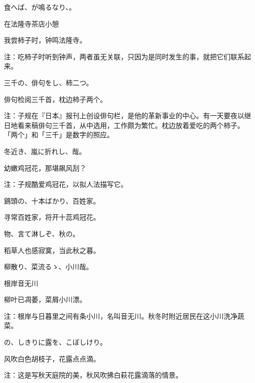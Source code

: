 \begin{haiku}
    {\FH {}食へば、が鳴るなり、。}

    {\FK 在法隆寺茶店小憩}

    {\FK 我尝柿子时，钟鸣法隆寺。}

    {\FT 注：吃柿子时听到钟声，两者虽无关联，只因为是同时发生的事，就把它们联系起来。}
\end{haiku}

\begin{haiku}
    {\FH 三千の、俳句をし、柿二つ。}

    {\FK 俳句检阅三千首，枕边柿子两个。}

    {\FT 注：子规在『日本』报刊上创设俳句栏，是他的革新事业的中心。有一天要夜以继日地看来稿俳句三千首，从中选用，工作颇为繁忙。枕边放着爱吃的两个柿子。「两个」和「三千」是数字的照应。}
\end{haiku}

\begin{haiku}
    {\FH 冬近き、嵐に折れし、哉。}

    {\FK 幼嫩鸡冠花，那堪飙风刮？}

    {\FT 注：子规酷爱鸡冠花，以拟人法描写它。}
\end{haiku}

\begin{haiku}
    {\FH 鷄頭の、十本ばかり、百姓家。}

    {\FK 寻常百姓家，将开十蕊鸡冠花。}
\end{haiku}

\begin{haiku}
    {\FH {}物、言て淋しぞ、秋の。}

    {\FK 稻草人也感寂寞，当此秋之暮。}
\end{haiku}

\begin{haiku}
    {\FH 柳散り、菜流るゝ、小川哉。}

    {\FK 根岸音无川}

    {\FK 柳叶已凋萎，菜屑小川漂。}

    {\FT 注：根岸与日暮里之间有条小川，名叫音无川。秋冬时附近居民在这小川洗净蔬菜。}
\end{haiku}

\begin{haiku}
    {\FH {}の、しきりに露を、こぼしけり。}

    {\FK 风吹白色胡枝子，花露点点滴。}

    {\FT 注：这是写秋天庭院的美，秋风吹拂白萩花露滴落的情景。}
\end{haiku}

